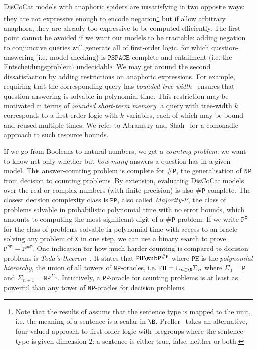 DisCoCat models with anaphoric spiders are unsatisfying in two opposite ways: they are not expressive enough to encode negation\footnote
{Note that the results of \cite{FeliceEtAl19} assume that the sentence type is mapped to the unit, i.e. the meaning of a sentence is a scalar in $\B$.
Preller~\cite{Preller14a,Preller14} takes an alternative, four-valued approach to first-order logic with pregroups where the sentence type is given dimension $2$: a sentence is either true, false, neither or both.}
but if allow arbitrary anaphora, they are already too expressive to be computed efficiently.
The first point cannot be avoided if we want our models to be tractable: adding negation to conjunctive queries will generate all of first-order logic, for which question-answering (i.e. model checking) is $\mathtt{PSPACE}$-complete and entailment (i.e. the Entscheidungsproblem) undecidable.
We may get around the second dissatisfaction by adding restrictions on anaphoric expressions.
For example, requiring that the corresponding query has \emph{bounded tree-width}~\cite{ChekuriRajaraman00} ensures that question answering is solvable in polynomial time.
This restriction may be motivated in terms of \emph{bounded short-term memory}: a query with tree-width $k$ corresponds to a first-order logic with $k$ variables, each of which may be bound and reused multiple times.
We refer to Abramsky and Shah~\cite{AbramskyShah18} for a comonadic approach to such resource bounds.

If we go from Booleans to natural numbers, we get a \emph{counting problem}: we want to know not only whether but \emph{how many} answers a question has in a given model.
This answer-counting problem is complete for $\mathtt{\#P}$, the generalisation of $\mathtt{NP}$ from decision to counting problems.
By extension, evaluating DisCoCat models over the real or complex numbers (with finite precision) is also $\mathtt{\#P}$-complete.
The closest decision complexity class is $\mathtt{PP}$, also called \emph{Majority-P}, the class of problems solvable in probabilistic polynomial time with no error bounds, which amounts to computing the most significant digit of a $\mathtt{\#P}$ problem.
If we write $\mathtt{P}^\mathtt{X}$ for the class of problems solvable in polynomial time with access to an oracle solving any problem of $\mathtt{X}$ in one step, we can use a binary search to prove $\mathtt{P}^\mathtt{PP} = \mathtt{P}^\mathtt{\#P}$.
One indication for how much harder counting is compared to decision problems is \emph{Toda's theorem}~\cite{Toda91}.
It states that $\mathtt{PH} \sub \mathtt{P}^\mathtt{\#P}$ where $\mathtt{PH}$ is the \emph{polynomial hierarchy}, the union of all towers of $\mathtt{NP}$-oracles, i.e. $\mathtt{PH} = \cup_{n \in \N} \Sigma_n$ where $\Sigma_0 = \mathtt{P}$ and $\Sigma_{n + 1} = \mathtt{NP}^{\Sigma_n}$.
Intuitively, a $\mathtt{PP}$-oracle for counting problems is at least as powerful than any tower of $\mathtt{NP}$-oracles for decision problems.


